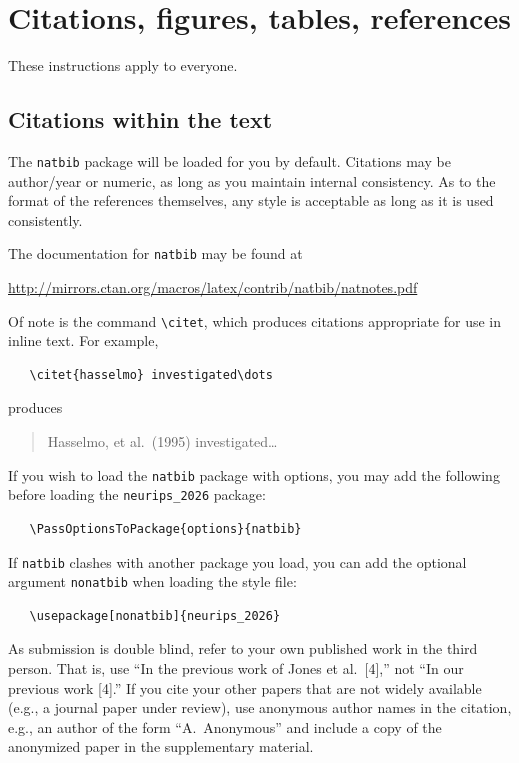 \documentclass{article}
\begin{document}
\section{Citations, figures, tables, references}
\label{others}


These instructions apply to everyone.


\subsection{Citations within the text}


The \verb+natbib+ package will be loaded for you by default.  Citations may be
author/year or numeric, as long as you maintain internal consistency.  As to the
format of the references themselves, any style is acceptable as long as it is
used consistently.


The documentation for \verb+natbib+ may be found at
\begin{center}
  \url{http://mirrors.ctan.org/macros/latex/contrib/natbib/natnotes.pdf}
\end{center}
Of note is the command \verb+\citet+, which produces citations appropriate for
use in inline text.  For example,
\begin{verbatim}
   \citet{hasselmo} investigated\dots
\end{verbatim}
produces
\begin{quote}
  Hasselmo, et al.\ (1995) investigated\dots
\end{quote}


If you wish to load the \verb+natbib+ package with options, you may add the
following before loading the \verb+neurips_2026+ package:
\begin{verbatim}
   \PassOptionsToPackage{options}{natbib}
\end{verbatim}


If \verb+natbib+ clashes with another package you load, you can add the optional
argument \verb+nonatbib+ when loading the style file:
\begin{verbatim}
   \usepackage[nonatbib]{neurips_2026}
\end{verbatim}


As submission is double blind, refer to your own published work in the third
person. That is, use ``In the previous work of Jones et al.\ [4],'' not ``In our
previous work [4].'' If you cite your other papers that are not widely available
(e.g., a journal paper under review), use anonymous author names in the
citation, e.g., an author of the form ``A.\ Anonymous'' and include a copy of the anonymized paper in the supplementary material.
\end{document}
